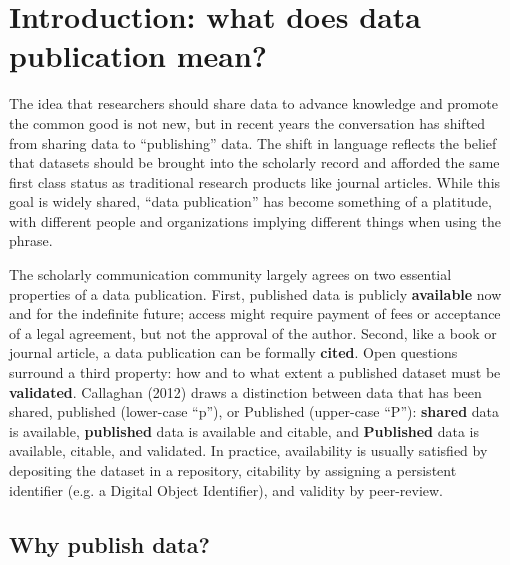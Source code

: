 \documentclass[10pt,twocolumn]{article}
\begin{document}
\section*{Introduction: what does data publication mean?}\label{introduction}

The idea that researchers should share data to advance knowledge and promote the common good is not new, but in recent years the conversation has shifted from sharing data to ``publishing'' data.\cite{costello_motivating_2009,smith_data_2009,lawrence_data_2011}
The shift in language reflects the belief that datasets should be brought into the scholarly record and afforded the same first class status as traditional research products like journal articles.\cite{sarah_callaghan_making_2012}
While this goal is widely shared,  ``data publication'' has become something of a platitude, with different people and organizations implying different things when using the phrase.

The scholarly communication community largely agrees on two essential properties of a data publication.\cite{smith_data_2009,sarah_callaghan_making_2012}
First, published data is publicly \textbf{available} now and for the indefinite future; access might require payment of fees or acceptance of a legal agreement, but not the approval of the author.
Second, like a book or journal article, a data publication can be formally \textbf{cited}.
Open questions surround a third property: how and to what extent a published dataset must be \textbf{validated}.
Callaghan (2012)\cite{sarah_callaghan_making_2012} draws a distinction between data that has been shared, published (lower-case “p”), or Published (upper-case “P”): \textbf{shared} data is available, \textbf{published} data is available and citable, and \textbf{Published} data is available, citable, and validated.
In practice, availability is usually satisfied by depositing the dataset in a repository, citability by assigning a persistent identifier (e.g. a Digital Object Identifier), and validity by peer-review.

\subsection*{Why publish data?}\label{why-publish-data}
\end{document}
